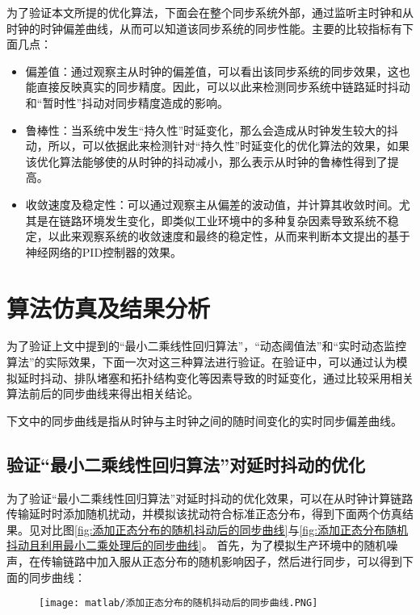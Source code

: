 为了验证本文所提的优化算法，下面会在整个同步系统外部，通过监听主时钟和从时钟的时钟偏差曲线，从而可以知道该同步系统的同步性能。主要的比较指标有下面几点：
\begin{itemize}[noitemsep,topsep=0pt,parsep=0pt,partopsep=0pt]
  \item 偏差值：通过观察主从时钟的偏差值，可以看出该同步系统的同步效果，这也能直接反映真实的同步精度。因此，可以以此来检测同步系统中链路延时抖动和“暂时性”抖动对同步精度造成的影响。
  \item 鲁棒性：当系统中发生“持久性”时延变化，那么会造成从时钟发生较大的抖动，所以，可以依据此来检测针对“持久性”时延变化的优化算法的效果，如果该优化算法能够使的从时钟的抖动减小，那么表示从时钟的鲁棒性得到了提高。
  \item 收敛速度及稳定性：可以通过观察主从偏差的波动值，并计算其收敛时间。尤其是在链路环境发生变化，即类似工业环境中的多种复杂因素导致系统不稳定，以此来观察系统的收敛速度和最终的稳定性，从而来判断本文提出的基于神经网络的PID控制器的效果。
\end{itemize}

\section{算法仿真及结果分析}
为了验证上文中提到的“最小二乘线性回归算法”，“动态阈值法”和“实时动态监控算法”的实际效果，下面一次对这三种算法进行验证。在验证中，可以通过认为模拟延时抖动、排队堵塞和拓扑结构变化等因素导致的时延变化，通过比较采用相关算法前后的同步曲线来得出相关结论。

下文中的同步曲线是指从时钟与主时钟之间的随时间变化的实时同步偏差曲线。

\subsection{验证“最小二乘线性回归算法”对延时抖动的优化}
为了验证“最小二乘线性回归算法”对延时抖动的优化效果，可以在从时钟计算链路传输延时时添加随机扰动，并模拟该扰动符合标准正态分布，得到下面两个仿真结果。见对比图\ref{fig:添加正态分布的随机抖动后的同步曲线}与\ref{fig:添加正态分布随机抖动且利用最小二乘处理后的同步曲线}。
首先，为了模拟生产环境中的随机噪声，在传输链路中加入服从正态分布的随机影响因子，然后进行同步，可以得到下面的同步曲线：
\begin{figure}[!hbp]
  \centering
  \begin{minipage}[b]{1\textwidth}
    \captionstyle{\centering}
    \centering
    \texttt{[image: matlab/添加正态分布的随机抖动后的同步曲线.PNG]}
  \end{minipage}     
\end{figure}

